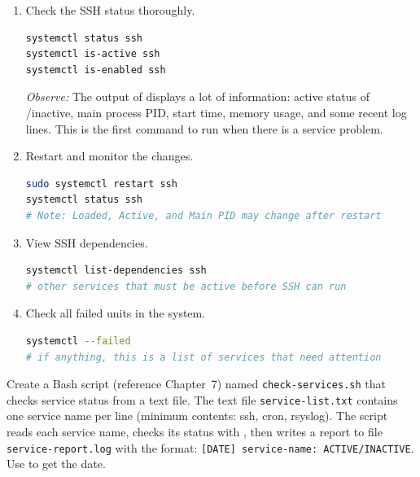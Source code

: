 \begin{enumerate}
\item Check the SSH status thoroughly.
\begin{lstlisting}[language=bash, caption={Checking the status of the SSH service}]
systemctl status ssh
systemctl is-active ssh
systemctl is-enabled ssh
\end{lstlisting}

\textit{Observe:} The output of  displays a lot of information: active status of /inactive, main process PID, start time, memory usage, and some recent log lines. This is the first command to run when there is a service problem.

\item Restart and monitor the changes.
\begin{lstlisting}[language=bash, caption={Restart the service and monitor the status}]
sudo systemctl restart ssh
systemctl status ssh
# Note: Loaded, Active, and Main PID may change after restart
\end{lstlisting}

\item View SSH dependencies.
\begin{lstlisting}[language=bash, caption={View SSH service dependencies}]
systemctl list-dependencies ssh
# other services that must be active before SSH can run
\end{lstlisting}

\item Check all failed units in the system.
\begin{lstlisting}[language=bash, caption={Failed service audit}]
systemctl --failed
# if anything, this is a list of services that need attention
\end{lstlisting}
\end{enumerate}

\begin{challengebox}
Create a Bash script (reference Chapter~7) named \texttt{check-services.sh} that checks service status from a text file. The text file \texttt{service-list.txt} contains one service name per line (minimum contents: ssh, cron, rsyslog). The script reads each service name, checks its status with , then writes a report to file \texttt{service-report.log} with the format: \texttt{[DATE] service-name: ACTIVE/INACTIVE}. Use  to get the date.
\end{challengebox}

